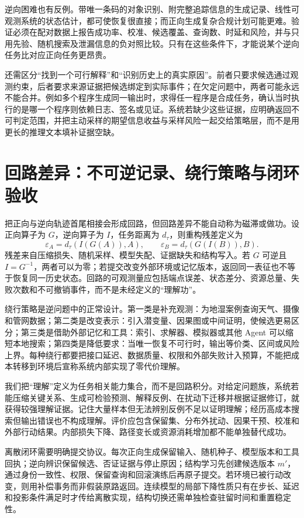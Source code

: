逆向困难也有反例。带唯一条码的对象识别、附完整追踪信息的生成记录、线性可观测系统的状态估计，都可使恢复很直接；而正向生成复杂合规计划可能更难。验证必须在配对数据上报告成功率、校准、候选覆盖、查询数、时延和风险，并与只用先验、随机搜索及泄漏信息的负对照比较。只有在这些条件下，才能说某个逆向任务比对应正向任务更昂贵。

还需区分“找到一个可行解释”和“识别历史上的真实原因”。前者只要求候选通过观测约束，后者要求来源证据把候选绑定到实际事件；在欠定问题中，两者可能永远不能合并。例如多个程序生成同一输出时，求得任一程序是合成任务，确认当时执行的是哪一个程序则依赖日志、签名或见证。系统若缺少这些证据，应明确返回不可判定范围，并把主动采样的期望信息收益与采样风险一起交给策略层，而不是用更长的推理文本填补证据空缺。

\section{回路差异：不可逆记录、绕行策略与闭环验收}
\label{sec:section_4854}

把正向与逆向轨迹首尾相接会形成回路，但回路差异不能自动称为磁滞或做功。设正向算子为 $G$，逆向算子为 $I$，任务距离为 $d_\tau$，则重构残差定义为
\[
\varepsilon_{A}=d_\tau(I(G(A)),A),\qquad
\varepsilon_{B}=d_\tau(G(I(B)),B).
\]
残差来自压缩损失、随机采样、模型失配、证据缺失和结构写入。若 $G$ 可逆且 $I=G^{-1}$，两者可以为零；若提交改变外部环境或记忆版本，返回同一表征也不等于恢复同一历史状态。回路的可观测量应包括端点误差、状态差分、资源总量、失败次数和不可撤销事件，而不是未经定义的“理解功”。

绕行策略是逆问题中的正常设计。第一类是补充观测：为地湿案例查询天气、摄像和管网数据；第二类是改变表示：引入潜变量、因果图或中间证明，使候选更易区分；第三类是借助外部记忆和工具：索引、求解器、模拟器或其他 Agent 可以缩短本地搜索；第四类是降低要求：当唯一恢复不可行时，输出等价类、区间或风险上界。每种绕行都要把接口延迟、数据质量、权限和外部失败计入预算，不能把成本转移到环境后宣称系统内部实现了零代价理解。

我们把“理解”定义为任务相关能力集合，而不是回路积分。对给定问题族，系统若能压缩关键关系、生成可检验预测、解释反例、在扰动下迁移并根据证据修订，就获得较强理解证据。记住大量样本但无法辨别反例不足以证明理解；经历高成本搜索但输出错误也不构成理解。评价应包含保留集、分布外扰动、因果干预、校准和外部行动结果。内部损失下降、路径变长或资源消耗增加都不能单独替代成功。

离散闭环需要明确提交协议。每次正向生成保留输入、随机种子、模型版本和工具回执；逆向辨识保留候选、否证证据与停止原因；结构学习先创建候选版本 $m'$，通过身份一致性、权限、保留查询和回滚演练后再原子提交。若环境已被行动改变，则用补偿事务而非假装原路返回。连续模型的局部下降性质只有在步长、延迟和投影条件满足时才传给离散实现，结构切换还需单独检查驻留时间和重置稳定性。

